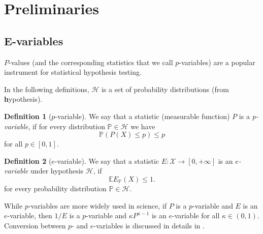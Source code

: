 \documentclass{article}
\theoremstyle{definition}
\theoremstyle{definition}
\newtheorem{definition}{Definition}[section]
\newcommand{\probP}{\mathbb{P}}
\newcommand{\expectE}{\mathbb{E}}
\begin{document}



\section{Preliminaries}


\subsection{E-variables}

$P$-values (and the corresponding statistics that we call $p$-variables) are a popular instrument for statistical hypothesis testing.

In the following definitions, $\mathcal{H}$ is a set of probability distributions (from \textbf{h}ypothesis).

\begin{definition}[$p$-variable]
    We say that a statistic (measurable function) $P$ is a \emph{p-variable}, if for every distribution $\probP\in\mathcal{H}$ we have
    \[
        \mathbb{P}(P(X) \leq p) \leq p
    \]
    for all $p \in [0,1]$.
\end{definition}




\begin{definition}[$e$-variable]
    We say that a statistic $E: \mathcal{X} \to [0,+\infty]$ is an \emph{$e$-variable} under hypothesis $\mathcal{H}$, if
    \[
        \expectE{E}_{\probP}(X) \leq 1.
    \]
    for every probability distribution $\probP\in\mathcal{H}$.
\end{definition}

While $p$-variables are more widely used in science, if $P$ is a $p$-variable and $E$ is an $e$-variable, then $1/E$ is a $p$-variable and $\kappa P^{\kappa-1}$ is an $e$-variable for all $\kappa\in(0,1)$. Conversion between $p$- and $e$-variables is discussed in details in \cite{VovkWang2021Calibration}.
\end{document}
